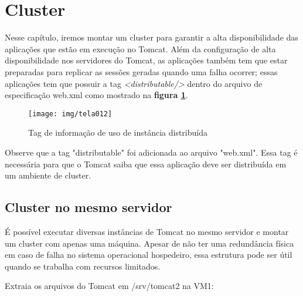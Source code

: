 \section{Cluster}

Nesse capítulo, iremos montar um cluster para garantir a alta disponibilidade das aplicações que estão em execução no Tomcat. Além da configuração de alta disponibilidade nos servidores do Tomcat, as aplicações também tem que estar preparadas para replicar as sessões geradas quando uma falha ocorrer; essas aplicações tem que possuir a tag \emph{<distributable/>} dentro do arquivo de especificação web.xml como mostrado na \textbf{figura \ref{fig:tomcat-wbexml-distributable}}.

\begin{figure}[H]
	\centering
	\caption[Tag distribuitble]{Tag de informação de uso de instância distribuída}
	\texttt{[image: img/tela012]}
	\label{fig:tomcat-wbexml-distributable}
\end{figure}

Observe que a tag "distributable" foi adicionada ao arquivo "web.xml". Essa tag é necessária para que o Tomcat saiba que essa aplicação deve ser distribuída em um ambiente de cluster.

\newpage
\subsection{Cluster no mesmo servidor}

É possível executar diversas instâncias de Tomcat no mesmo servidor e montar um cluster com apenas uma máquina. Apesar de não ter uma redundância física em caso de falha no sistema operacional hospedeiro, essa estrutura pode ser útil quando se trabalha com recursos limitados.

Extraia os arquivos do Tomcat em /srv/tomcat2 na VM1:

